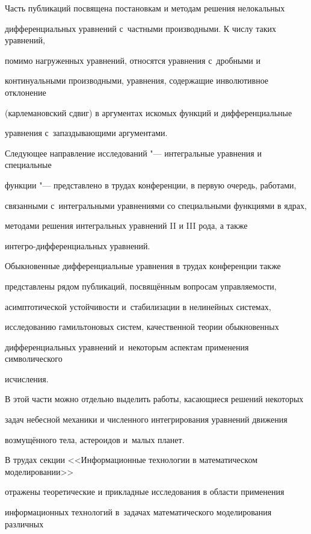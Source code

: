 Часть публикаций посвящена постановкам и методам решения нелокальных 

дифференциальных уравнений с~частными производными. К числу таких уравнений, 

помимо нагруженных уравнений, относятся уравнения с~дробными и 

континуальными производными, уравнения, содержащие инволютивное отклонение 

(карлемановский сдвиг) в аргументах искомых функций и дифференциальные 

уравнения с~запаздывающими аргументами.



Следующее направление исследований "--- интегральные уравнения и специальные 

функции "--- представлено в трудах конференции, в первую очередь, работами, 

связанными с~интегральными уравнениями со специальными функциями в ядрах, 

методами решения интегральных уравнений II и III рода, а также 

интегро-дифференциальных уравнений.



Обыкновенные дифференциальные уравнения в трудах конференции также 

представлены рядом публикаций, посвящённым вопросам управляемости, 

асимптотической устойчивости и~стабилизации в нелинейных системах, 

исследованию гамильтоновых систем, качественной теории обыкновенных 

дифференциальных уравнений и~некоторым аспектам применения символического 

исчисления.



В этой части можно отдельно выделить работы, касающиеся решений некоторых 

задач небесной механики и численного интегрирования уравнений движения 

возмущённого тела, астероидов и~малых планет. 



В трудах секции <<Информационные технологии в математическом моделировании>> 

отражены теоретические и прикладные исследования в области применения 

информационных технологий в~задачах математического моделирования различных 

